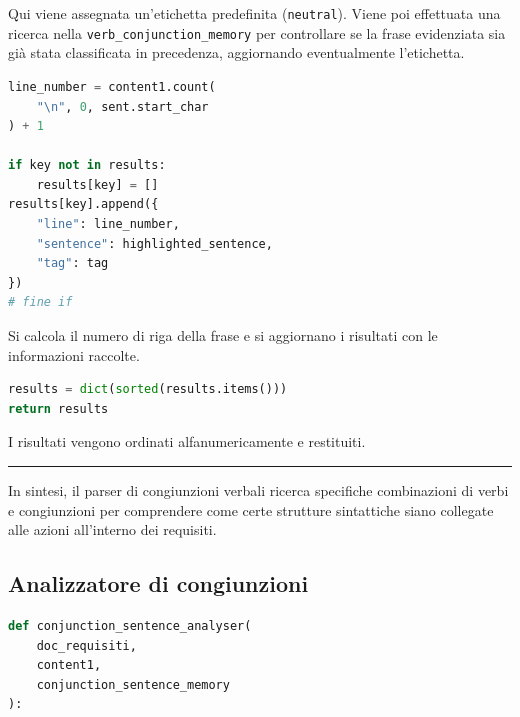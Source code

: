 \documentclass[12pt]{report}
\begin{document}
\noindent Qui viene assegnata un'etichetta predefinita (\texttt{neutral}). Viene poi effettuata una ricerca nella \texttt{verb\_conjunction\_memory} per controllare se la frase evidenziata sia già stata classificata in precedenza, aggiornando eventualmente l'etichetta.


\begin{mdframed}
\small
\begin{lstlisting}[language=Python]
line_number = content1.count(
    "\n", 0, sent.start_char
) + 1

if key not in results:
    results[key] = []
results[key].append({
    "line": line_number,
    "sentence": highlighted_sentence,
    "tag": tag
})
# fine if
\end{lstlisting}
\end{mdframed}

\noindent Si calcola il numero di riga della frase e si aggiornano i risultati con le informazioni raccolte.


\begin{mdframed}
\small
\begin{lstlisting}[language=Python]
results = dict(sorted(results.items()))
return results
\end{lstlisting}
\end{mdframed}

\noindent I risultati vengono ordinati alfanumericamente e restituiti.


{\centering \rule{0.5\linewidth}{0.1pt} \par\vspace{0.25cm}}

In sintesi, il \textsf{parser di congiunzioni verbali} ricerca specifiche combinazioni di verbi e congiunzioni per comprendere come certe strutture sintattiche siano collegate alle azioni all'interno dei requisiti.


\subsection{Analizzatore di congiunzioni}

\begin{mdframed}
\small
\begin{lstlisting}[language=Python]
def conjunction_sentence_analyser(
    doc_requisiti,
    content1,
    conjunction_sentence_memory
):
\end{lstlisting}
\end{mdframed}
\end{document}
